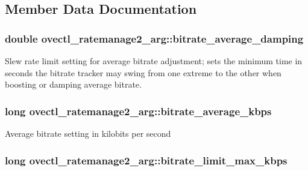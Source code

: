 \subsection{Member Data Documentation}
\hypertarget{structovectl__ratemanage2__arg_a1069e148a884d8706928cd2e39870720}{
\subsubsection[{bitrate\+\_\+average\+\_\+damping}]{\setlength{\rightskip}{0pt plus 5cm}double ovectl\+\_\+ratemanage2\+\_\+arg\+::bitrate\+\_\+average\+\_\+damping}}\label{structovectl__ratemanage2__arg_a1069e148a884d8706928cd2e39870720}
Slew rate limit setting for average bitrate adjustment; sets the minimum time in seconds the bitrate tracker may swing from one extreme to the other when boosting or damping average bitrate. \hypertarget{structovectl__ratemanage2__arg_a1f6bab60d87143d5060dd6c59aad6e71}{
\subsubsection[{bitrate\+\_\+average\+\_\+kbps}]{\setlength{\rightskip}{0pt plus 5cm}long ovectl\+\_\+ratemanage2\+\_\+arg\+::bitrate\+\_\+average\+\_\+kbps}}\label{structovectl__ratemanage2__arg_a1f6bab60d87143d5060dd6c59aad6e71}
Average bitrate setting in kilobits per second \hypertarget{structovectl__ratemanage2__arg_a175691482003edd7d94592fa2bc993a9}{
\subsubsection[{bitrate\+\_\+limit\+\_\+max\+\_\+kbps}]{\setlength{\rightskip}{0pt plus 5cm}long ovectl\+\_\+ratemanage2\+\_\+arg\+::bitrate\+\_\+limit\+\_\+max\+\_\+kbps}}\label{structovectl__ratemanage2__arg_a175691482003edd7d94592fa2bc993a9}
